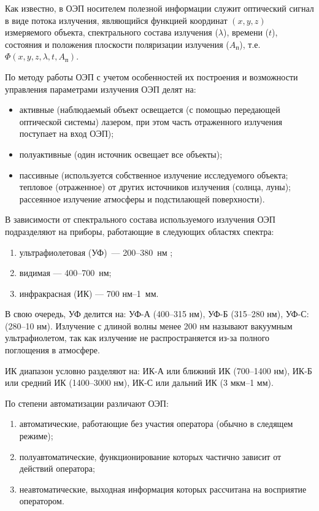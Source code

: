 \documentclass{tufte-book}
\begin{document}
Как известно, в ОЭП носителем полезной информации служит оптический сигнал в виде потока излучения, являющийся функцией координат $(x, y, z)$ измеряемого объекта, спектрального состава излучения ($\lambda$), времени ($t$), состояния и положения плоскости поляризации излучения ($A_\text{п}$), т.е. $\Phi(x, y, z, \lambda, t, A_\text{п})$. 

По методу работы ОЭП с учетом особенностей их построения и возможности управления параметрами излучения ОЭП делят на:
\begin{itemize}
	\item активные (наблюдаемый объект освещается (с помощью передающей оптической системы) лазером, при этом часть отраженного излучения поступает на вход ОЭП);
	\item полуактивные (один источник освещает все объекты);
	\item пассивные (используется собственное излучение исследуемого объекта; тепловое  (отраженное) от других источников излучения (солнца, луны); рассеянное излучение атмосферы и подстилающей поверхности).
\end{itemize}

В зависимости от спектрального состава используемого излучения ОЭП подразделяют на приборы, работающие в следующих областях спектра:
\begin{enumerate}
	\item ультрафиолетовая (УФ)~--- 200--380~нм ;
	\item видимая --- 400--700~нм;
	\item инфракрасная (ИК) --- 700 нм--1~мм.
\end{enumerate}

В свою очередь, УФ делится на: УФ-А (400--315 нм), УФ-Б (315--280 нм), УФ-С: (280--10 нм). Излучение с длиной волны менее 200 нм называют вакуумным ультрафиолетом, так как излучение не распространяется из-за полного поглощения в атмосфере.

ИК диапазон условно разделяют на: ИК-А или ближний ИК (700--1400 нм), ИК-Б или средний ИК (1400--3000 нм), ИК-С или дальний ИК (3 мкм--1 мм).

По степени автоматизации различают ОЭП:
\begin{enumerate}
	\item автоматические, работающие без участия оператора (обычно в следящем режиме);
	\item полуавтоматические, функционирование которых частично зависит от действий оператора;
	\item неавтоматические, выходная информация которых рассчитана на восприятие оператором.
\end{enumerate}
\end{document}
